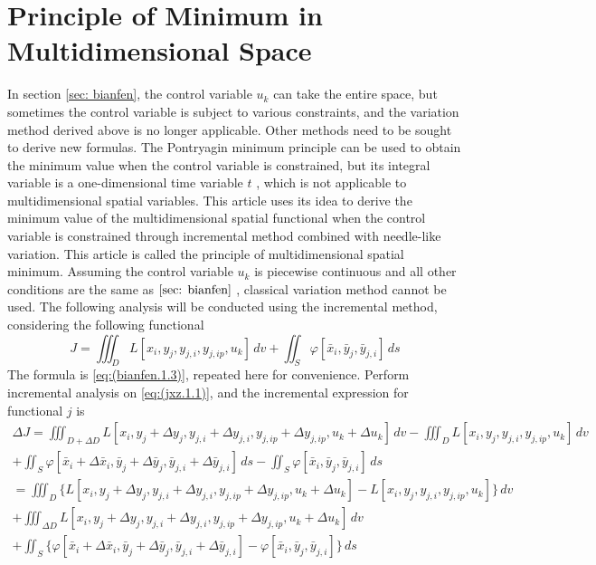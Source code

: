 \section {Principle of Minimum in Multidimensional Space} \label{sec: jxz}
In section \ref{sec: bianfen}, the control variable $ u_k $ can take the entire space, but sometimes the control variable is subject to various constraints, and the variation method derived above is no longer applicable. Other methods need to be sought to derive new formulas. The Pontryagin minimum principle can be used to obtain the minimum value when the control variable is constrained, but its integral variable is a one-dimensional time variable $ t $ , which is not applicable to multidimensional spatial variables. This article uses its idea to derive the minimum value of the multidimensional spatial functional when the control variable is constrained through incremental method combined with needle-like variation. This article is called the principle of multidimensional spatial minimum.
Assuming the control variable $ u_k $ is piecewise continuous and all other conditions are the same as $ \ref{sec: bianfen}$  , classical variation method cannot be used. The following analysis will be conducted using the incremental method, considering the following functional
\begin{equation}\label{eq:(jxz.1.1)}
J = \iiint_D L[x_i,y_j,y_{j,i},y_{j,ip},u_k] \,dv + \iint_S \varphi[\bar{x}_i,\bar{y}_j,\bar{y}_{j,i}] \,ds
\end{equation}
The formula is \ref{eq:(bianfen.1.3)}, repeated here for convenience.
Perform incremental analysis on \ref{eq:(jxz.1.1)}, and the incremental expression for functional $ j$  is
\begin{multline} \label{eq:(jxz.1.2)}    
\Delta J = \iiint_{D+\Delta D} L[x_i,y_j+\Delta y_j,y_{j,i}+\Delta y_{j,i},y_{j,ip}+\Delta y_{j, ip},u_k+\Delta u_k] \,dv 
-\iiint_D L[x_i,y_j,y_{j,i},y_{j,ip},u_k] \,dv 
\\+ \iint_S \varphi[\bar {x}_i +\Delta \bar {x}_i ,\bar {y}_j +\Delta \bar {y}_j ,\bar {y}_ {j,i}+\Delta \bar {y}_ {j,i}] \,ds
- \iint_S \varphi[\bar {x}_i ,\bar {y}_j ,\bar {y}_ {j,i}] \,ds
\\= \iiint_D \{L[x_i,y_j+\Delta y_j,y_{j,i}+\Delta y_{j,i},y_{j,ip}+\Delta y_{j,ip},u_k+\Delta u_k]-L[x_i,y_j,y_{j,i},y_{j,ip},u_k] \}\,dv 
\\+\iiint_{\Delta D} L[x_i,y_j+\Delta y_j,y_{j,i}+\Delta y_{j,i},y_{j,ip}+\Delta y_{j, ip},u_k+\Delta u_k] \,dv 
\\+\iint_S \{\varphi[\bar {x}_i +\Delta \bar {x}_i ,\bar {y}_j +\Delta \bar {y}_j ,\bar {y}_ {j,i}+\Delta \bar {y}_ {j,i}] -\varphi[\bar {x}_i ,\bar {y}_j ,\bar {y}_ {j,i}]\} \,ds
\end{multline} 
